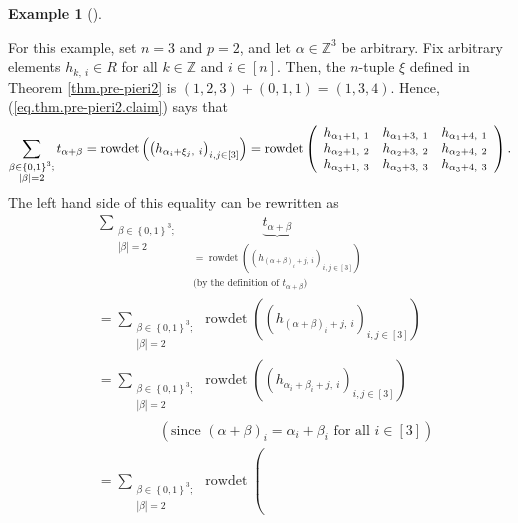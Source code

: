 \documentclass[numbers=enddot,12pt,final,onecolumn,notitlepage,english]{scrartcl}%
\theoremstyle{definition}
\newtheorem{exam}[theo]{Example}
\newenvironment{example}[1][]
{\begin{exam}[#1]\begin{leftbar}}
{\end{leftbar}\end{exam}}
\let\sumnonlimits\sum
\renewcommand{\sum}{\sumnonlimits\limits}
\begin{document}
\begin{example}
For this example, set $n=3$ and $p=2$, and let $\alpha\in\mathbb{Z}^{3}$ be
arbitrary. Fix arbitrary elements $h_{k,\ i}\in R$ for all $k\in\mathbb{Z}$
and $i\in\left[  n\right]  $. Then, the $n$-tuple $\xi$ defined in Theorem
\ref{thm.pre-pieri2} is $\left(  1,2,3\right)  +\left(  0,1,1\right)  =\left(
1,3,4\right)  $. Hence, (\ref{eq.thm.pre-pieri2.claim}) says that%
\[
\sum_{\substack{\beta\in\left\{  0,1\right\}  ^{3};\\\left\vert \beta
\right\vert =2}}t_{\alpha+\beta}=\operatorname*{rowdet}\left(  \left(
h_{\alpha_{i}+\xi_{j},\ i}\right)  _{i,j\in\left[  3\right]  }\right)
=\operatorname*{rowdet}\left(
\begin{array}
[c]{ccc}%
h_{\alpha_{1}+1,\ 1} & h_{\alpha_{1}+3,\ 1} & h_{\alpha_{1}+4,\ 1}\\
h_{\alpha_{2}+1,\ 2} & h_{\alpha_{2}+3,\ 2} & h_{\alpha_{2}+4,\ 2}\\
h_{\alpha_{3}+1,\ 3} & h_{\alpha_{3}+3,\ 3} & h_{\alpha_{3}+4,\ 3}%
\end{array}
\right)  .
\]
The left hand side of this equality can be rewritten as%
\begin{align*}
&  \sum_{\substack{\beta\in\left\{  0,1\right\}  ^{3};\\\left\vert
\beta\right\vert =2}}\ \ \underbrace{t_{\alpha+\beta}}%
_{\substack{=\operatorname*{rowdet}\left(  \left(  h_{\left(  \alpha
+\beta\right)  _{i}+j,\ i}\right)  _{i,j\in\left[  3\right]  }\right)
\\\text{(by the definition of }t_{\alpha+\beta}\text{)}}}\\
&  =\sum_{\substack{\beta\in\left\{  0,1\right\}  ^{3};\\\left\vert
\beta\right\vert =2}}\operatorname*{rowdet}\left(  \left(  h_{\left(
\alpha+\beta\right)  _{i}+j,\ i}\right)  _{i,j\in\left[  3\right]  }\right) \\
&  =\sum_{\substack{\beta\in\left\{  0,1\right\}  ^{3};\\\left\vert
\beta\right\vert =2}}\operatorname*{rowdet}\left(  \left(  h_{\alpha_{i}%
+\beta_{i}+j,\ i}\right)  _{i,j\in\left[  3\right]  }\right) \\
&  \ \ \ \ \ \ \ \ \ \ \ \ \ \ \ \ \ \ \ \ \left(  \text{since }\left(
\alpha+\beta\right)  _{i}=\alpha_{i}+\beta_{i}\text{ for all }i\in\left[
3\right]  \right) \\
&  =\sum_{\substack{\beta\in\left\{  0,1\right\}  ^{3};\\\left\vert
\beta\right\vert =2}}\operatorname*{rowdet}\left(

\end{align*}
\end{example}
\end{document}
